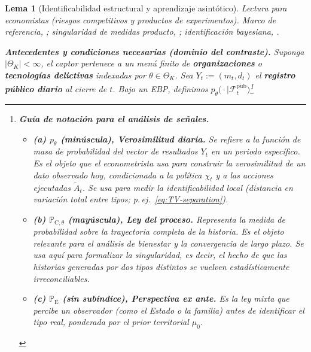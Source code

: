 \documentclass[12pt]{article}
\providecommand{\textcite}{\citet}
\newenvironment{fnnote}{%
  \begin{minipage}[t]{\linewidth}%
  \sloppy
}{\end{minipage}}
\newtheorem{lemma}[theorem]{Lema}
\theoremstyle{definition}
\theoremstyle{remark}
\newcommand{\ProbE}{\mathbb{P}_{\mathrm{E}}}
\newcommand{\ProbC}[1]{\mathbb{P}_{\mathrm{C},#1}}
\newcommand{\1}{\mathbf{1}}
\begin{document}
\begin{lemma}[Identificabilidad estructural y aprendizaje asintótico]
\label{lem:hazard-separation}
\noindent\textit{Lectura para economistas \textup{(}riesgos competitivos y productos de experimentos\textup{)}.} Marco de referencia, \textcite{Cox1972,Bradburn2003}; singularidad de medidas producto, \textcite{Kakutani1948,Shiryaev2019Probability}; identificación bayesiana, \textcite{Schervish1995Theory}.

\medskip
\noindent\textbf{Antecedentes y condiciones necesarias \textup{(}dominio del contraste\textup{)}.}
Suponga $\lvert\Theta_K\rvert<\infty$, el captor pertenece a un menú finito de \textbf{organizaciones} o \textbf{tecnologías delictivas} indexadas por $\theta\in\Theta_K$. Sea $Y_t:=(m_t,d_t)$ el \textbf{registro público diario} al cierre de $t$. Bajo un EBP, definimos $p_\theta\bigl(\cdot\mid \mathcal{F}_t^{\mathrm{pub}}\bigr)$\footnote{\begin{fnnote}\textbf{Guía de notación para el análisis de señales.}\par
\begin{itemize}
  \setlength{\itemsep}{0.15em}%
  \setlength{\parsep}{0pt}%
  \item \textbf{\textup{(a)} $p_\theta$ \textup{(}minúscula\textup{)}, Verosimilitud diaria.} Se refiere a la función de masa de probabilidad del vector de resultados $Y_t$ en un periodo específico. Es el objeto que el econometrista usa para construir la verosimilitud de un dato observado hoy, condicionada a la política $\chi_t$ y a las acciones ejecutadas $\tilde{A}_t$. Se usa para medir la \textit{identificabilidad local} \textup{(}distancia en variación total entre tipos; p.\,ej.\ \eqref{eq:TV-separation}\textup{)}.
  \item \textbf{\textup{(b)} $\ProbC{\theta}$ \textup{(}mayúscula\textup{)}, Ley del proceso.} Representa la medida de probabilidad sobre la trayectoria completa de la historia. Es el objeto relevante para el análisis de bienestar y la convergencia de largo plazo. Se usa aquí para formalizar la \textit{singularidad}, es decir, el hecho de que las historias generadas por dos tipos distintos se vuelven estadísticamente irreconciliables.
  \item \textbf{\textup{(c)} $\ProbE$ \textup{(}sin subíndice\textup{)}, Perspectiva \emph{ex ante}.} Es la ley mixta que percibe un observador \textup{(}como el Estado o la familia\textup{)} antes de identificar el tipo real, ponderada por el prior territorial $\mu_0$.
\end{itemize}

\end{fnnote}}
\end{lemma}
\end{document}

